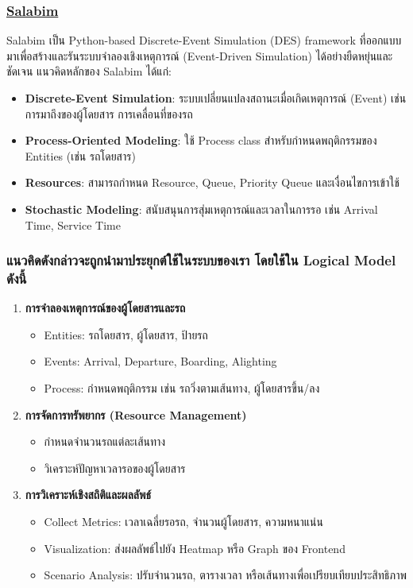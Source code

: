 \subsubsection{\textbf{\underline{Salabim}}}
\begin{mypara}
    \indent Salabim เป็น Python-based Discrete-Event Simulation (DES) framework ที่ออกแบบมาเพื่อสร้างและรันระบบจำลองเชิงเหตุการณ์ (Event-Driven Simulation) ได้อย่างยืดหยุ่นและชัดเจน 
แนวคิดหลักของ Salabim ได้แก่:
\end{mypara}

\begin{itemize}
    \item \textbf{Discrete-Event Simulation}: ระบบเปลี่ยนแปลงสถานะเมื่อเกิดเหตุการณ์ (Event) เช่น การมาถึงของผู้โดยสาร การเคลื่อนที่ของรถ
    \item \textbf{Process-Oriented Modeling}: ใช้ Process class สำหรับกำหนดพฤติกรรมของ Entities (เช่น รถโดยสาร)
    \item \textbf{Resources}: สามารถกำหนด Resource, Queue, Priority Queue และเงื่อนไขการเข้าใช้
    \item \textbf{Stochastic Modeling}: สนับสนุนการสุ่มเหตุการณ์และเวลาในการรอ เช่น Arrival Time, Service Time
\end{itemize}

\subsubsection{\textbf{แนวคิดดังกล่าวจะถูกนํามาประยุกต์ใช้ในระบบของเรา โดยใช้ใน Logical Model ดังนี้}}
\begin{enumerate}
    \item \textbf{การจำลองเหตุการณ์ของผู้โดยสารและรถ}
    \begin{itemize}
        \item Entities: รถโดยสาร, ผู้โดยสาร, ป้ายรถ
        \item Events: Arrival, Departure, Boarding, Alighting
        \item Process: กำหนดพฤติกรรม เช่น รถวิ่งตามเส้นทาง, ผู้โดยสารขึ้น/ลง
    \end{itemize}
    
    \item \textbf{การจัดการทรัพยากร (Resource Management)}
    \begin{itemize}
        \item กำหนดจำนวนรถแต่ละเส้นทาง
        \item วิเคราะห์ปัญหาเวลารอของผู้โดยสาร 
    \end{itemize}
    
    \item \textbf{การวิเคราะห์เชิงสถิติและผลลัพธ์}
    \begin{itemize}
        \item Collect Metrics: เวลาเฉลี่ยรอรถ, จำนวนผู้โดยสาร, ความหนาแน่น
        \item Visualization: ส่งผลลัพธ์ไปยัง Heatmap หรือ Graph ของ Frontend
        \item Scenario Analysis: ปรับจำนวนรถ, ตารางเวลา หรือเส้นทางเพื่อเปรียบเทียบประสิทธิภาพ
    \end{itemize}
\end{enumerate}

